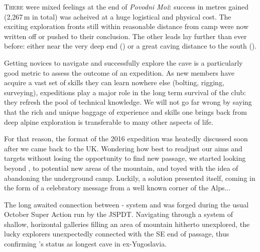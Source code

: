 \newpage
\thispagestyle{endchapter}

\begin{tcolorbox}
\vspace{80pt}
	\lettrine{T}{here} were mixed feelings at the end of \emph{Povodni Mo\v{z}}: success in metres gained (2,267\,m in total) was acheived at a huge logistical and physical cost. The exciting exploration fronts still within reasonable distance from  camp were now written off or pushed to their conclusion. The other leads lay further than ever before: either near the very deep end () or a great caving distance to the south ().

	Getting novices to navigate and successfully explore the cave is a particularly good metric to assess the outcome of an expedition. As new members have acquire a vast set of skills they can learn nowhere else (bolting, rigging, surveying), expeditions play a major role in the long term survival of the club: they refresh the pool of technical knowledge. We will not go far wrong by saying that the rich and unique baggage of experience and skills one brings back from deep alpine exploration is transferable to many other aspects of life.

	For that reason, the format of the 2016 expedition was heatedly discussed soon after we came back to the UK. Wondering how best to readjust our aims and targets without losing the opportunity to find new passage, we started looking beyond , to potential new areas of the mountain, and toyed with the idea of abandoning the underground camp. Luckily, a solution presented itself, coming in the form of a celebratory message from a well known corner of the Alps...

	The long awaited connection between  -  system and   was forged during the usual October Super Action run by the JSPDT. Navigating through a system of shallow, horizontal galleries filling an area of mountain hitherto unexplored, the lucky explorers unexpectedly connected with the SE end of  passage, thus confirming 's status as longest cave in ex-Yugoslavia.

	
\end{tcolorbox}
